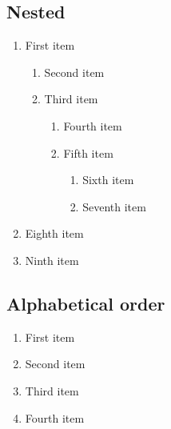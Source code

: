 \subsection{Nested}
\begin{enumerate}
    \item First item
    \begin{enumerate}
        \item Second item
        \item Third item
        \begin{enumerate}
            \item Fourth item
            \item Fifth item
            \begin{enumerate}
                \item Sixth item
                \item Seventh item
            \end{enumerate}
        \end{enumerate}
    \end{enumerate}
    \item Eighth item
    \item Ninth item
\end{enumerate}

\subsection{Alphabetical order }
\begin{enumerate}[label=\Alph*.]
    \item First item
    \item Second item
    \item Third item
    \item Fourth item
\end{enumerate}

